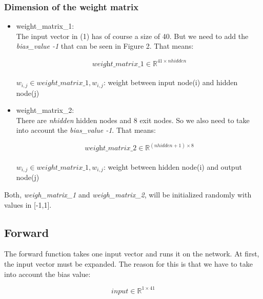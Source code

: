\documentclass[10pt,a4paper]{article}
\begin{document}
	\subsubsection{Dimension of the weight matrix}			%
		\begin{itemize}
		\item weight\_matrix\_1: \\
		The input vector in (1) has of course a size of 40. But we need to add the \textit{bias\_value -1} that can be seen in Figure 2. That means: \\ 
		\begin{center}
			\begin{equation}
			 \textit{weight\_matrix\_1} \in \mathbb{R}^{41 \times nhidden} 
			\end{equation} 
			\\
			 $w_{i,j} \in weight\_matrix\_1, w_{i,j}$: weight between input node(i) and hidden node(j) 
		\end{center}
		\item weight\_matrix\_2: \\
		There are \textit{nhidden} hidden nodes and 8 exit nodes. So we also need to take into account the \textit{bias\_value -1}. That means: \\
		\begin{center}
			\begin{equation}
			\textit{weight\_matrix\_2} \in \mathbb{R}^{(nhidden+1) \times 8} 
			\end{equation}
			\\
			$w_{i,j} \in weight\_matrix\_1, w_{i,j}$: weight between hidden node(i) and output node(j)  
		\end{center}
	\end{itemize} 
	Both, \textit{weigh\_matrix\_1} and \textit{weigh\_matrix\_2}, will be initialized randomly with values in [-1,1].
	
	\subsection{Forward}								%
	The forward function takes one input vector and runs it on the network. At first, the input vector must be expanded. The reason for this is that we have to take into account the bias value:	
	\begin{center}
		\begin{equation}
		\textit{input} \in \mathbb{R}^{1\times 41} 
		\end{equation} 
	\end{center}
\end{document}

